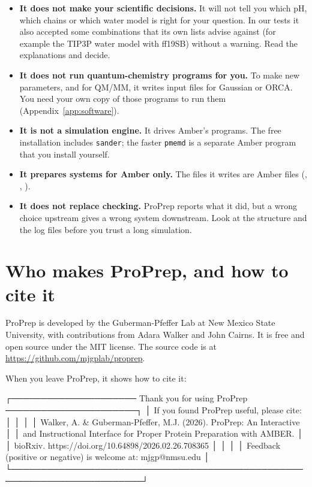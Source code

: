 \begin{itemize}
  \item \textbf{It does not make your scientific decisions.} It will not tell
        you which pH, which chains or which water model is right for your
        question. In our tests it also accepted some combinations that its
        own lists advise against (for example the TIP3P water model with
        ff19SB) without a warning. Read the explanations and decide.
  \item \textbf{It does not run quantum-chemistry programs for you.} To make
        new parameters, and for QM/MM, it writes input files for Gaussian or
        ORCA. You need your own copy of those programs to run them
        (Appendix~\ref{app:software}).
  \item \textbf{It is not a simulation engine.} It drives Amber's programs.
        The free installation includes \texttt{sander}; the faster
        \texttt{pmemd} is a separate Amber program that you install
        yourself.
  \item \textbf{It prepares systems for Amber only.} The files it writes are
        Amber files (, , ).
  \item \textbf{It does not replace checking.} ProPrep reports what it did, but
        a wrong choice upstream gives a wrong system downstream. Look at the
        structure and the log files before you trust a long simulation.
\end{itemize}

\section{Who makes ProPrep, and how to cite it}
\label{sec:whatis-cite}

ProPrep is developed by the Guberman-Pfeffer Lab at New Mexico State
University, with contributions from Adara Walker and John Cairns. It is free
and open source under the MIT license. The source code is at
\url{https://github.com/mjgplab/proprep}.

When you leave ProPrep, it shows how to cite it:

\begin{screen}
┌───────────────────── Thank you for using ProPrep ──────────────────────┐
│ If you found ProPrep useful, please cite:                              │
│                                                                        │
│ Walker, A. & Guberman-Pfeffer, M.J. (2026). ProPrep: An Interactive    │
│ and Instructional Interface for Proper Protein Preparation with AMBER. │
│ bioRxiv. https://doi.org/10.64898/2026.02.26.708365                    │
│                                                                        │
│ Feedback (positive or negative) is welcome at: mjgp@nmsu.edu           │
└────────────────────────────────────────────────────────────────────────┘
\end{screen}

